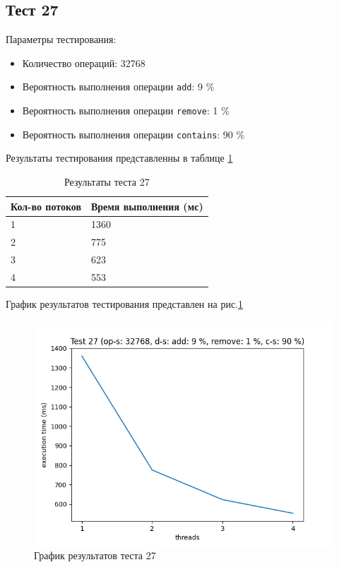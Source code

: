 \subsection*{Тест 27}

Параметры тестирования:

\begin{itemize}
    \item Количество операций: 32768
    \item Вероятность выполнения операции \verb|add|: 9 \%
    \item Вероятность выполнения операции \verb|remove|: 1 \%
    \item Вероятность выполнения операции \verb|contains|: 90 \%
\end{itemize}

Результаты тестирования представленны в таблице \ref{tab:results27}


\begin{table}[H]
    \centering
    \begin{tabular}{|l|l|}
        \hline
        Кол-во потоков & Время выполнения (мс) \\
        \hline
        1 & 1360 \\
        \hline
        2 & 775 \\
        \hline
        3 & 623 \\
        \hline
        4 & 553 \\
        \hline
    \end{tabular}
    \caption{Результаты теста 27}
    \label{tab:results27}
\end{table}
        

График результатов тестирования представлен на рис.\ref{fig:plot27}

\begin{figure}[H]
    \centering
    \includegraphics[width=0.7\linewidth]{photo/plot27}
    \caption{График результатов теста 27}
    \label{fig:plot27}
\end{figure}

